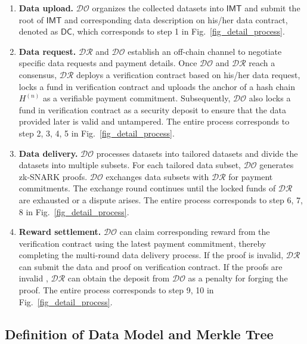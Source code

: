 \documentclass[journal]{IEEEtran}
\begin{document}
\begin{enumerate}
    \item \textbf{Data upload.} 
    $\mathcal{DO}$ organizes the collected datasets into $\mathsf{IMT}$ and submit the root of $\mathsf{IMT}$ and corresponding data description on his/her data contract, denoted as $\mathsf{DC}$, which corresponds to step 1 in Fig.~\ref{fig_detail_process}.
    
    \item \textbf{Data request.} 
    $\mathcal{DR}$ and $\mathcal{DO}$ establish an off-chain channel to negotiate specific data requests and payment details. Once $\mathcal{DO}$ and $\mathcal{DR}$ reach a consensus, $\mathcal{DR}$ deploys a verification contract based on his/her data request, locks a fund in verification contract and uploads the anchor of a hash chain $H^{(n)}$ as a verifiable payment commitment. Subsequently, $\mathcal{DO}$ also locks a fund in verification contract as a security deposit to ensure that the data provided later is valid and untampered. The entire process corresponds to step 2, 3, 4, 5 in Fig.~\ref{fig_detail_process}.
    
    \item \textbf{Data delivery.}
    $\mathcal{DO}$ processes datasets into tailored datasets and divide the datasets into multiple subsets. For each tailored data subset, $\mathcal{DO}$ generates zk-SNARK proofs. $\mathcal{DO}$ exchanges data subsets with $\mathcal{DR}$ for payment commitments. The exchange round continues until the locked funds of $\mathcal{DR}$ are exhausted or a dispute arises. The entire process corresponds to step 6, 7, 8 in Fig.~\ref{fig_detail_process}.
    
    \item \textbf{Reward settlement.}
    $\mathcal{DO}$ can claim corresponding reward from the verification contract using the latest payment commitment, thereby completing the multi-round data delivery process. If the proof is invalid, $\mathcal{DR}$ can submit the data and proof on verification contract. If the proofs are invalid , $\mathcal{DR}$ can obtain the deposit from $\mathcal{DO}$ as a penalty for forging the proof.  The entire process corresponds to step 9, 10 in Fig.~\ref{fig_detail_process}.
    
\end{enumerate}

\subsection{Definition of Data Model and Merkle Tree}
\end{document}
